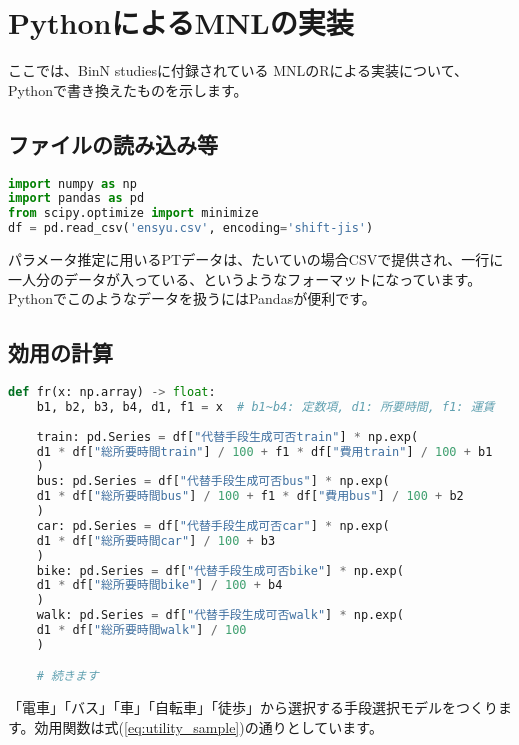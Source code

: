 \chapter{PythonによるMNLの実装}\label{code}

ここでは、BinN studies\cite{Hato2014}に付録されている MNLのRによる実装について、Pythonで書き換えたものを示します。

\section{ファイルの読み込み等}

\begin{lstlisting}[language=Python]
import numpy as np
import pandas as pd
from scipy.optimize import minimize
df = pd.read_csv('ensyu.csv', encoding='shift-jis')
\end{lstlisting}

パラメータ推定に用いるPTデータは、たいていの場合CSVで提供され、一行に一人分のデータが入っている、というようなフォーマットになっています。Pythonでこのようなデータを扱うにはPandasが便利です。

\section{効用の計算}

\begin{lstlisting}[language=Python]
def fr(x: np.array) -> float:
    b1, b2, b3, b4, d1, f1 = x  # b1~b4: 定数項, d1: 所要時間, f1: 運賃
    
    train: pd.Series = df["代替手段生成可否train"] * np.exp(
    d1 * df["総所要時間train"] / 100 + f1 * df["費用train"] / 100 + b1
    )
    bus: pd.Series = df["代替手段生成可否bus"] * np.exp(
    d1 * df["総所要時間bus"] / 100 + f1 * df["費用bus"] / 100 + b2
    )
    car: pd.Series = df["代替手段生成可否car"] * np.exp(
    d1 * df["総所要時間car"] / 100 + b3
    )
    bike: pd.Series = df["代替手段生成可否bike"] * np.exp(
    d1 * df["総所要時間bike"] / 100 + b4
    )
    walk: pd.Series = df["代替手段生成可否walk"] * np.exp(
    d1 * df["総所要時間walk"] / 100
    )

    # 続きます
\end{lstlisting}

「電車」「バス」「車」「自転車」「徒歩」から選択する手段選択モデルをつくります。効用関数は式(\ref{eq:utility_sample})の通りとしています。

